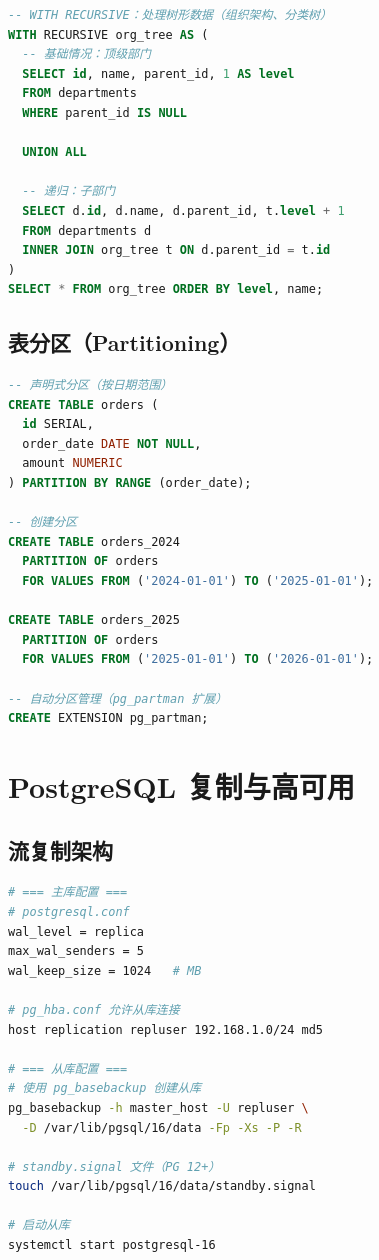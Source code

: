 \documentclass[12pt,UTF8]{ctexbook}
\begin{document}
\begin{lstlisting}[language=sql]
-- WITH RECURSIVE：处理树形数据（组织架构、分类树）
WITH RECURSIVE org_tree AS (
  -- 基础情况：顶级部门
  SELECT id, name, parent_id, 1 AS level
  FROM departments
  WHERE parent_id IS NULL
  
  UNION ALL
  
  -- 递归：子部门
  SELECT d.id, d.name, d.parent_id, t.level + 1
  FROM departments d
  INNER JOIN org_tree t ON d.parent_id = t.id
)
SELECT * FROM org_tree ORDER BY level, name;
\end{lstlisting}

\subsection*{表分区（Partitioning）}

\begin{lstlisting}[language=sql]
-- 声明式分区（按日期范围）
CREATE TABLE orders (
  id SERIAL,
  order_date DATE NOT NULL,
  amount NUMERIC
) PARTITION BY RANGE (order_date);

-- 创建分区
CREATE TABLE orders_2024 
  PARTITION OF orders 
  FOR VALUES FROM ('2024-01-01') TO ('2025-01-01');

CREATE TABLE orders_2025 
  PARTITION OF orders 
  FOR VALUES FROM ('2025-01-01') TO ('2026-01-01');

-- 自动分区管理（pg_partman 扩展）
CREATE EXTENSION pg_partman;
\end{lstlisting}

\section{PostgreSQL 复制与高可用}
\label{sec:postgresql-replication}

\subsection*{流复制架构}

\begin{lstlisting}[language=bash]
# === 主库配置 ===
# postgresql.conf
wal_level = replica
max_wal_senders = 5
wal_keep_size = 1024   # MB

# pg_hba.conf 允许从库连接
host replication repluser 192.168.1.0/24 md5

# === 从库配置 ===
# 使用 pg_basebackup 创建从库
pg_basebackup -h master_host -U repluser \
  -D /var/lib/pgsql/16/data -Fp -Xs -P -R

# standby.signal 文件（PG 12+）
touch /var/lib/pgsql/16/data/standby.signal

# 启动从库
systemctl start postgresql-16
\end{lstlisting}
\end{document}
